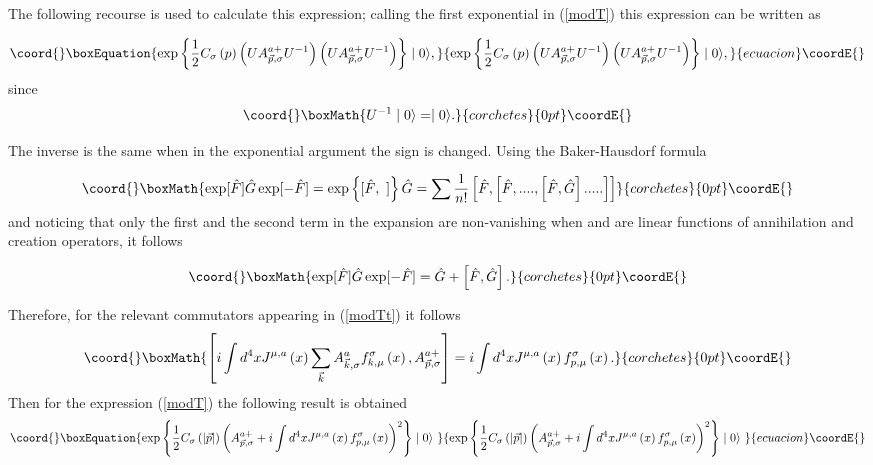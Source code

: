\documentclass[12pt,letterpaper]{report}
\begin{document}
The following recourse is used to calculate this expression;
calling \coordHE{} the first exponential in (\ref{modT}) this expression
can be written as

\begin{equation}\coord{}\boxEquation{
\exp \left\{ \frac 12C_\sigma\left(p\right) \left(
UA_{\vec{p},\sigma }^{a+}U^{-1}\right) \left(UA_{\vec{p},\sigma
}^{a+}U^{-1}\right) \right\} \mid 0\rangle, \label{modTt}
}{
\exp \left\{ \frac 12C_\sigma\left(p\right) \left(
UA_{\vec{p},\sigma }^{a+}U^{-1}\right) \left(UA_{\vec{p},\sigma
}^{a+}U^{-1}\right) \right\} \mid 0\rangle, }{ecuacion}\coordE{}\end{equation}
since
\[\coord{}\boxMath{
U^{-1}\mid 0\rangle =\mid 0\rangle.
}{corchetes}{0pt}\coordE{}\]

The inverse \coordHE{} is the same \coordHE{} when in the exponential
argument the sign is changed. Using the Baker-Hausdorf formula

\[\coord{}\boxMath{
\exp [\hat{F}]\hat{G}\exp [-\hat{F}]=\exp \left\{ [\hat{F},\
]\right\} \hat{G }=\sum \frac 1{n!}\left[ \hat{F},\left[
\hat{F},....,\left[ \hat{F},\hat{G} \right].....\right] \right]
}{corchetes}{0pt}\coordE{}\]
and noticing that only the first and the second term in the
expansion are non-vanishing when \coordHE{} and \coordHE{} are
linear functions of annihilation and creation operators, it
follows

\[\coord{}\boxMath{
\exp [\hat{F}]\hat{G}\exp [-\hat{F}]=\hat{G}+\left[
\hat{F},\hat{G}\right].
}{corchetes}{0pt}\coordE{}\]

Therefore, for the relevant commutators appearing in (\ref{modTt})
it follows
\[\coord{}\boxMath{
\left[ i\int d^4xJ^{\mu,a}\left(x\right)
\sum\limits_{\vec{k}}A_{\vec{k},\sigma }^af_{k,\mu }^\sigma \left(
x\right),A_{\vec{p},\sigma }^{a+}\right] =i\int d^4xJ^{\mu
,a}\left(x\right) f_{p,\mu }^\sigma \left(x\right).
}{corchetes}{0pt}\coordE{}\]
Then for the expression (\ref{modT}) the following result is
obtained
\begin{equation}\coord{}\boxEquation{
\exp \left\{ \frac 12C_\sigma \left(\left| \vec{p}\right| \right)
\left(A_{ \vec{p},\sigma }^{a+}+i\int d^4xJ^{\mu,a}\left(x\right)
f_{p,\mu }^\sigma \left(x\right) \right) ^2\right\} \mid 0\rangle
\ \label{T}
}{
\exp \left\{ \frac 12C_\sigma \left(\left| \vec{p}\right| \right)
\left(A_{ \vec{p},\sigma }^{a+}+i\int d^4xJ^{\mu,a}\left(x\right)
f_{p,\mu }^\sigma \left(x\right) \right) ^2\right\} \mid 0\rangle
\ }{ecuacion}\coordE{}\end{equation}
\end{document}
